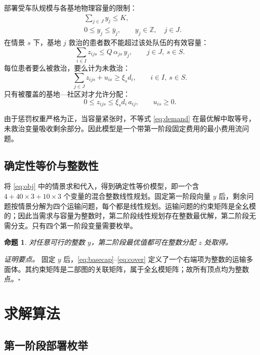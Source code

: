 \documentclass[12pt,a4paper,fontset=windows]{ctexart}
\newtheorem{proposition}{命题}
\begin{document}
部署受车队规模与各基地物理容量的限制：
\begin{align}
&\sum_{j\in J} y_j \le K, \label{eq:fleet}\\
&0 \le y_j \le \bar y_j, \qquad y_j \in \mathbb{Z}, \quad j\in J. \label{eq:cap}
\end{align}
在情景 $s$ 下，基地 $j$ 救治的患者数不能超过该处队伍的有效容量：
\begin{equation}
\sum_{i\in I} z_{ijs} \le Q\,\alpha_{js}\,y_j, \qquad j\in J,\ s\in S.
\label{eq:basecap}
\end{equation}
每位患者要么被救治，要么计为未救治：
\begin{equation}
\sum_{j\in J} z_{ijs} + u_{is} \ge \xi_s d_i, \qquad i\in I,\ s\in S.
\label{eq:demand}
\end{equation}
只有被覆盖的基地—社区对才允许分配：
\begin{equation}
0 \le z_{ijs} \le \xi_s d_i\, a_{ij}, \qquad u_{is}\ge 0.
\label{eq:cover}
\end{equation}

由于惩罚权重严格为正，当容量紧张时，不等式 \eqref{eq:demand} 在最优解中取等号，未救治变量吸收剩余部分。因此模型是一个带第一阶段固定费用的最小费用流问题。

\subsection{确定性等价与整数性}

将 \eqref{eq:obj} 中的情景求和代入，得到确定性等价模型，即一个含 $4+40\times3+10\times3$ 个变量的混合整数线性规划。固定第一阶段向量 $y$ 后，剩余问题按情景分解为四个运输问题，每个都是线性规划。运输问题的约束矩阵是全幺模的；因此当需求与容量为整数时，第二阶段线性规划存在整数最优解，第二阶段无需分支。只有四个第一阶段变量需要枚举。

\begin{proposition}
对任意可行的整数 $y$，第二阶段最优值都可在整数分配 $z$ 处取得。
\end{proposition}

\noindent\textit{证明要点。} 固定 $y$ 后，\eqref{eq:basecap}--\eqref{eq:cover} 定义了一个右端项为整数的运输多面体。其约束矩阵是二部图的关联矩阵，属于全幺模矩阵；故所有顶点均为整数点。\hfill$\square$

\section{求解算法}

\subsection{第一阶段部署枚举}
\end{document}
